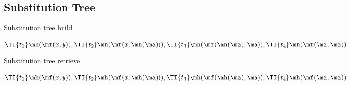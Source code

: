 



















\subsection{Substitution Tree}

\begin{example}{Substitution tree build}

	\(
	\TI{t_1}\mh(\mf(x,y)),
	\TI{t_2}\mh(\mf(x,\mh(\ma))),
	\TI{t_3}\mh(\mf(\mh(\ma),\ma)),
	\TI{t_4}\mh(\mf(\ma,\ma))
	 \)

	\begin{tikzpicture}[->]
%	
	

	\end{tikzpicture}
\end{example}

\begin{example}{Substitution tree retrieve}

	\(
	\TI{t_1}\mh(\mf(x,y)),
	\TI{t_2}\mh(\mf(x,\mh(\ma))),
	\TI{t_3}\mh(\mf(\mh(\ma),\ma)),
	\TI{t_4}\mh(\mf(\ma,\ma))
	 \)

	\begin{tikzpicture}[->]
%	
	
	\end{tikzpicture}
\end{example}

